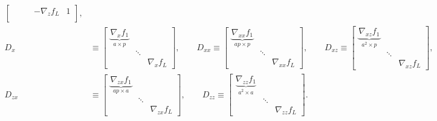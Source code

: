 \documentclass{article}
\begin{document}
\begin{align*}
\begin{bmatrix}
                                                               &               &        & -\nabla_z f_L & 1 \\
                   \end{bmatrix}
    ,                                                                                                \\
    D_x    & \equiv  \begin{bmatrix}
                         \underbrace{\nabla_x f_1}_{a\times p} &                       \\
                                                               & \ddots                \\
                                                               &        & \nabla_x f_L
                     \end{bmatrix}
    , \qquad
    D_{xx} \equiv \begin{bmatrix}
                      \underbrace{\nabla_{xx} f_1}_{ap\times p} &        &                 \\
                                                                & \ddots &                 \\
                                                                &        & \nabla_{xx} f_L
                  \end{bmatrix}
    , \qquad
    D_{xz} \equiv
    \begin{bmatrix}
        \underbrace{\nabla_{xz} f_1}_{a^2 \times p} &        &                 \\
                                                    & \ddots &                 \\
                                                    &        & \nabla_{xz} f_L
    \end{bmatrix}
    ,                                                                                                \\
    D_{zx} & \equiv \begin{bmatrix}
                        \underbrace{\nabla_{zx} f_1}_{ap \times a} &        &                 \\
                                                                   & \ddots &                 \\
                                                                   &        & \nabla_{zx} f_L
                    \end{bmatrix}
    ,
    \qquad
    D_{zz}  \equiv \begin{bmatrix}
                       \underbrace{\nabla_{zz} f_1}_{a^2\times a} &        &                 \\
                                                                  & \ddots &                 \\
                                                                  &        & \nabla_{zz} f_L
                   \end{bmatrix}
    .
\end{align*}
\end{document}
